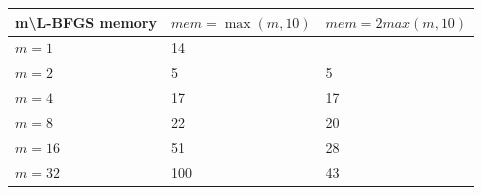 \documentclass[11pt,a4paper]{report}
\begin{document}
\begin{center}
    \begin{tabular}{| l | l | l |}
    \hline
    m\textbackslash L-BFGS memory & $mem =\max(m,10)$& $mem=2max(m,10)$\\ \hline
    $m=1$  &  14 &  \\ \hline
    $m=2$  &  5 &  5	\\ \hline
    $m=4$ &  17 & 17 \\ \hline
    $m=8$ &  22 &  20	\\ \hline
    $m=16$ &  51 & 28 \\ \hline
    $m=32$ &  100 &  43	\\ \hline
    \end{tabular}
\end{center}
\end{document}
